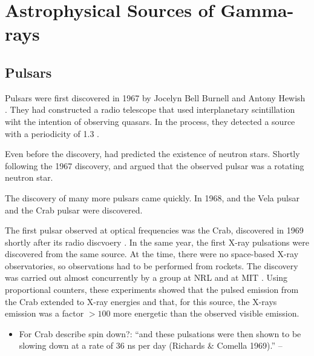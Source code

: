 \section{Astrophysical Sources of Gamma-rays}

\subsection{Pulsars}


Pulsars were first discovered in 1967 by Jocelyn Bell Burnell and Antony
Hewish \citep{hewish_1968_observation-rapidly}. They had constructed a
radio telescope that used interplanetary scintillation wiht the intention
of observing quasars.  In the process, they detected a source with a
periodicity of 1.3 \second.


Even before the discovery, \cite{pacini_1967_energy-emission} had predicted
the existence of neutron stars.  Shortly following the 1967 discovery,
\cite{gold_1968_rotating-neutron} and \cite{pacini_1968_rotating-neutron}
argued that the observed pulsar was a rotating neutron star.

The discovery of many more pulsars came quickly.  In 1968, and the
Vela pulsar \citep{large_1968_pulsar-supernova} and the Crab pulsar
\citep{staelin_1968_pulsating-radio} were discovered.

The first pulsar observed at optical frequencies was the
Crab, discovered in 1969 shortly after its radio discvoery
\citep{cocke_1969_discovery-optical}.
In the same year, the first X-ray pulsations were discovered from
the same source. At the time, there were no space-based X-ray
observatories, so observations had to be performed from rockets.
The discovery was carried out almost concurrently by a group
at \ac{NRL} \citep{fritz_1969_x-ray-pulsar} and at \ac{MIT}
\citep{bradt_1969_x-ray-optical}.  Using proportional counters,
these experiments showed that the pulsed emission from 
the Crab extended to X-ray energies and that, for this source,
the X-rays emission was a factor $>100$ more energetic than
the observed visible emission.

\begin{itemize}
  \item For Crab describe spin down?: ``and these pulsations were then shown to be slowing down at a
    rate of 36 ns per day (Richards \& Comella 1969).'' -- \cite{gaensler_2006_evolution-structure}
\end{itemize}

